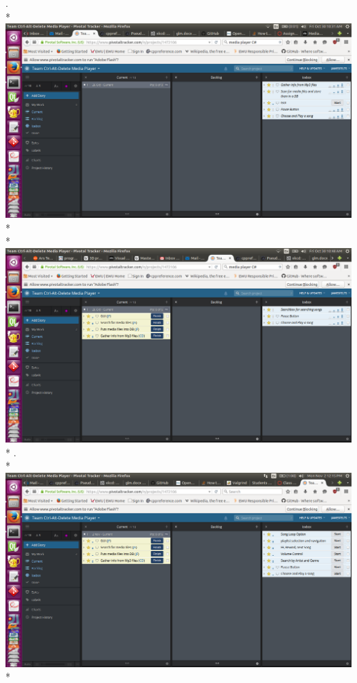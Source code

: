 \documentclass{article}
\begin{document}
.\\*
\includegraphics[scale=0.3]{Screenshot from 2015-10-30 10-31-05.png}\\*
\\*
\includegraphics[scale=0.3]{Screenshot from 2015-10-30 10-48-18.png}\\*
\newpage
.\\*
\includegraphics[scale=0.3]{Screenshot from 2015-11-02 12-15-26.png}\\*
\end{document}
